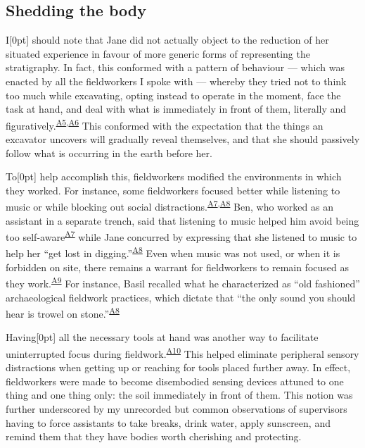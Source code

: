 \documentclass[
]{article}
\newcommand{\paragraphnumber}[1]{\marginnote{\color{lightgray}\tiny{#1}}[0pt]}
\begin{document}
\subsection{Shedding the body}\label{shedding-the-body}

I\paragraphnumber{[31]} should note that Jane did not actually object to
the reduction of her situated experience in favour of more generic forms
of representing the stratigraphy. In fact, this conformed with a pattern
of behaviour --- which was enacted by all the fieldworkers I spoke with
--- whereby they tried not to think too much while excavating, opting
instead to operate in the moment, face the task at hand, and deal with
what is immediately in front of them, literally and
figuratively.\textsuperscript{\hyperref[sec-A5]{A5},\hyperref[sec-A6]{A6}}
This conformed with the expectation that the things an excavator
uncovers will gradually reveal themselves, and that she should passively
follow what is occurring in the earth before her.

To\paragraphnumber{[32]} help accomplish this, fieldworkers modified the
environments in which they worked. For instance, some fieldworkers
focused better while listening to music or while blocking out social
distractions.\textsuperscript{\hyperref[sec-A7]{A7},\hyperref[sec-A8]{A8}}
Ben, who worked as an assistant in a separate trench, said that
listening to music helped him avoid being too
self-aware\textsuperscript{\hyperref[sec-A7]{A7}} while Jane concurred
by expressing that she listened to music to help her ``get lost in
digging.''\textsuperscript{\hyperref[sec-A8]{A8}} Even when music was
not used, or when it is forbidden on site, there remains a warrant for
fieldworkers to remain focused as they
work.\textsuperscript{\hyperref[sec-A9]{A9}} For instance, Basil
recalled what he characterized as ``old fashioned'' archaeological
fieldwork practices, which dictate that ``the only sound you should hear
is trowel on stone.''\textsuperscript{\hyperref[sec-A8]{A8}}

Having\paragraphnumber{[33]} all the necessary tools at hand was another
way to facilitate uninterrupted focus during
fieldwork.\textsuperscript{\hyperref[sec-A10]{A10}} This helped
eliminate peripheral sensory distractions when getting up or reaching
for tools placed further away. In effect, fieldworkers were made to
become disembodied sensing devices attuned to one thing and one thing
only: the soil immediately in front of them. This notion was further
underscored by my unrecorded but common observations of supervisors
having to force assistants to take breaks, drink water, apply sunscreen,
and remind them that they have bodies worth cherishing and protecting.
\end{document}
